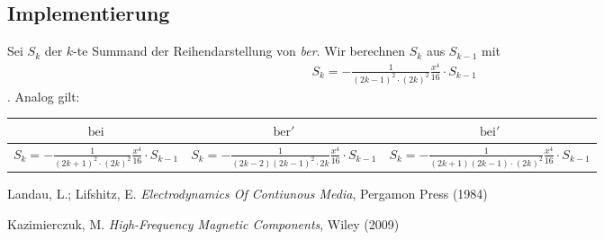 \documentclass[10pt,a4paper]{article}
\begin{document}
\subsection{Implementierung}

Sei $S_k$ der $k$-te Summand der Reihendarstellung von \emph{ber}. Wir berechnen $S_k$ aus $S_{k-1}$ mit
\begin{align}
	S_k=-\frac{1}{(2k-1)^2\cdot(2k)^2}\frac{x^4}{16}\cdot S_{k-1}
\end{align}.
Analog gilt:\newline
\begin{tabular}{c|c|c}
\rule[1ex]{0pt}{2.5ex} $\mathrm{bei}$ & $\mathrm{ber}'$ & $\mathrm{bei}'$ \\ 
\hline 
\rule[1ex]{0pt}{2.5ex} $S_k=-\frac{1}{(2k+1)^2\cdot(2k)^2}\frac{x^4}{16}\cdot S_{k-1}$ & $S_k=-\frac{1}{(2k-2)(2k-1)^2\cdot 2k}\frac{x^4}{16}\cdot S_{k-1}$ & $S_k=-\frac{1}{(2k+1)(2k-1) \cdot (2k)^2}\frac{x^4}{16}\cdot S_{k-1}$ \\ 
\end{tabular}
\begin{thebibliography}{9}

Landau, L.; Lifshitz, E.
\emph{Electrodynamics Of Contiunous Media},
Pergamon Press (1984)

Kazimierczuk, M.
\emph{High-Frequency Magnetic Components},
Wiley (2009)

\end{thebibliography}
\end{document}
